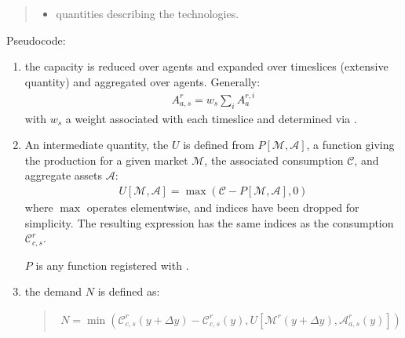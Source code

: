 \documentclass[letterpaper,10pt,english]{sphinxmanual}
\begin{document}
\begin{fulllineitems}
\begin{quote}
\begin{description}
\begin{itemize}
\item {} 
 \textendash{} quantities describing the technologies.

\end{itemize}

\end{description}\end{quote}

Pseudo\sphinxhyphen{}code:
\begin{enumerate}
%
\item {} 
the capacity is reduced over agents and  expanded over timeslices (extensive
quantity) and aggregated over agents. Generally:
\begin{equation*}
\begin{split}A_{a, s}^r = w_s\sum_i A_a^{r, i}\end{split}
\end{equation*}
with \(w_s\) a weight associated with each timeslice and determined via
.

\item {} 
An intermediate quantity, the  \(U\) is defined from
\(P[\mathcal{M}, \mathcal{A}]\), a function giving the production for a given
market \(\mathcal{M}\), the associated consumption \(\mathcal{C}\), and
aggregate assets \(\mathcal{A}\):
\begin{equation*}
\begin{split}U[\mathcal{M}, \mathcal{A}] =
  \max(\mathcal{C} - P[\mathcal{M}, \mathcal{A}], 0)\end{split}
\end{equation*}
where \(\max\) operates element\sphinxhyphen{}wise, and indices have been dropped for
simplicity. The resulting expression has the same indices as the consumption
\(\mathcal{C}_{c, s}^r\).

\(P\) is any function registered with
.

\item {} 
the  demand \(N\) is defined as:
\begin{quote}
\begin{equation*}
\begin{split}N = \min\left(
    \mathcal{C}_{c, s}^r(y + \Delta y) - \mathcal{C}_{c, s}^r(y),
    U[\mathcal{M}^r(y + \Delta y), \mathcal{A}_{a, s}^r(y)]
\right)\end{split}
\end{equation*}\end{quote}


\end{enumerate}
\end{fulllineitems}
\end{document}
